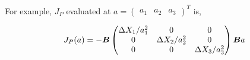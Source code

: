 \documentclass[american]{scrartcl}
\begin{document}
For example, $J_P$ evaluated at $a = \begin{pmatrix}
		a_1 & a_2 & a_3
	\end{pmatrix}^T$ is,

\begin{equation}
	J_P(a) = - \bm{B} \begin{pmatrix}
		\Delta X_1 / a_1^2 & 0                  & 0                  \\
		0                  & \Delta X_2 / a_2^2 & 0                  \\
		0                  & 0                  & \Delta X_3 / a_3^2
	\end{pmatrix} \bm{B} a
\end{equation}
\end{document}
